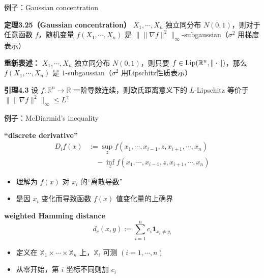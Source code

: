 \documentclass{beamer}
\begin{document}
\begin{frame}{例子：Gaussian concentration}

\textbf{定理3.25（Gaussian concentration）} $X_1, \cdots, X_n$ 独立同分布 $N(0, 1)$，则对于任意函数 $f$，随机变量 $f(X_1, \cdots, X_n)$ 是 $\|\|\nabla f\|^2\|_{\infty}$-subgaussian（$\sigma^2$ 用梯度表示）

\quad

\textbf{重新表述：} $X_1, \cdots, X_n$ 独立同分布 $N(0, 1)$，则只要 $f\in{\rm Lip}(\mathbb{R}^{n}, \|\cdot\|)$，那么$f(X_1, \cdots, X_n)$ 是 $1$-subgaussian（$\sigma^2$ 用Lipschitz性质表示）

\quad

\textbf{引理4.3} 设 $f: \mathbb{R}^n \to \mathbb{R}$ 一阶导数连续，则欧氏距离意义下的 $L$-Lipschitz 等价于 $\|\|\nabla f\|^2\|_{\infty} \le L^2$

\end{frame}

\begin{frame}{例子：McDiarmid's inequality}

\textbf{“discrete derivative”}
$$
\begin{aligned}
D_i f(x) &:= \sup_{z} f(x_1,\cdots,x_{i-1},z,x_{i+1},\cdots,x_n) \\
&\quad - \inf_{z} f(x_1,\cdots,x_{i-1},z,x_{i+1},\cdots,x_n)
\end{aligned}
$$

\begin{itemize}
    \item 理解为 $f(x)$ 对 $x_i$ 的“离散导数”
    \item 是因 $x_i$ 变化而导致函数 $f(x)$ 值变化量的上确界
\end{itemize}

\textbf{weighted Hamming distance}
$$
d_c(x, y) := \sum_{i=1}^{n} c_i \mathbf{1}_{x_i\neq y_i}
$$

\begin{itemize}
    \item 定义在 $\mathbb{X}_1\times\cdots\times\mathbb{X}_n$ 上，$\mathbb{X}_i$ 可测 $(i=1,\cdots,n)$
    \item 从零开始，第 $i$ 坐标不同则加 $c_i$
\end{itemize}

\end{frame}
\end{document}
